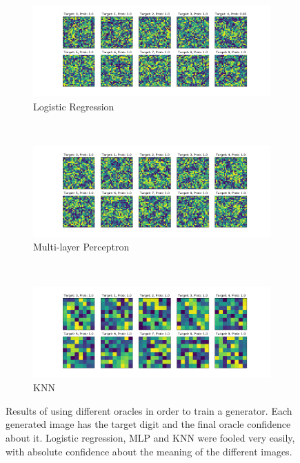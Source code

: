     \begin{figure}[!htbp]
      \centering
      \begin{subfigure}[b]{\textwidth}
        \includegraphics[scale=0.5]{images/adv_attack/lr.png}
        \caption{Logistic Regression}
        \label{subfig:lr}
      \end{subfigure}
      ~
      \begin{subfigure}[b]{\textwidth}
        \includegraphics[scale=0.5]{images/adv_attack/mlp.png}
        \caption{Multi-layer Perceptron}
        \label{subfig:mlp}
      \end{subfigure}
      ~
      \begin{subfigure}[b]{\textwidth}
        \includegraphics[scale=0.5]{images/adv_attack/knn.png}
        \caption{KNN}
        \label{subfig:knn}
      \end{subfigure}
      \label{fig:generator_on_oracles}
      \caption{Results of using different oracles in order to train a generator. Each generated image has the target digit and the final oracle confidence about it. Logistic regression, MLP and KNN were fooled very easily, with absolute confidence about the meaning of the different images.}
    \end{figure}

